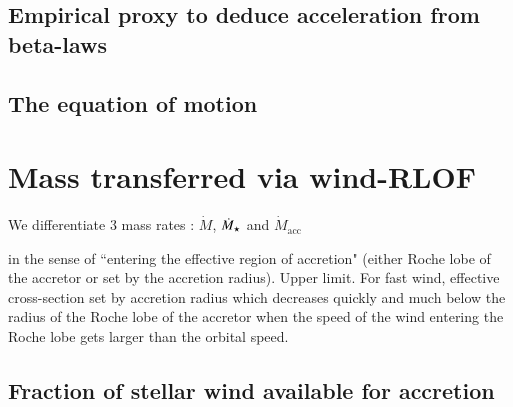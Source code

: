 \documentclass[letter]{aa}
\makeatletter
\newcommand{\mystar}{{\fontfamily{lmr}\selectfont$\star$}}
\newcommand*{\mdotstar}{$\dot{M}_{\text{\mystar}}$\@\xspace}
\newcommand*{\mdotacc}{$\dot{M}_{\text{acc}}$\@\xspace}
\makeatother
\begin{document}
\subsection{Empirical proxy to deduce acceleration from beta-laws}
\label{sec:}

\subsection{The equation of motion}
\label{sec:}

\section{Mass transferred via wind-RLOF}
\label{sec:}

We differentiate 3 mass rates : $\dot{M}$, \mdotstar and \mdotacc

in the sense of “entering the effective region of accretion" (either Roche lobe of the accretor or set by the accretion radius). Upper limit. For fast wind, effective cross-section set by accretion radius which decreases quickly and much below the radius of the Roche lobe of the accretor when the speed of the wind entering the Roche lobe gets larger than the orbital speed.

\subsection{Fraction of stellar wind available for accretion}
\label{sec:}
\end{document}
